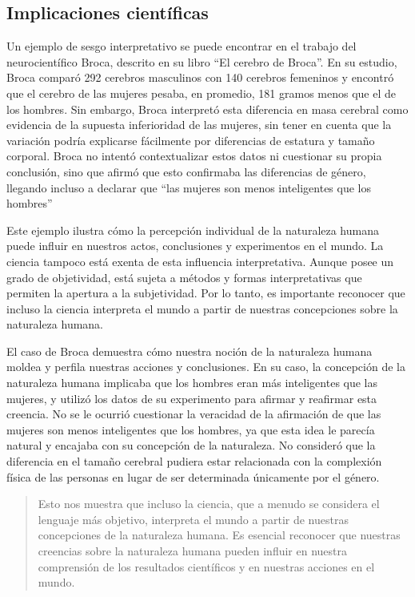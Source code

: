 \documentclass[
  a4paper,
]{article}
\begin{document}
\subsection{Implicaciones
científicas}\label{implicaciones-cientuxedficas}

Un ejemplo de sesgo interpretativo se puede encontrar en el trabajo del
neurocientífico Broca, descrito en su libro ``El cerebro de Broca''. En
su estudio, Broca comparó 292 cerebros masculinos con 140 cerebros
femeninos y encontró que el cerebro de las mujeres pesaba, en promedio,
181 gramos menos que el de los hombres. Sin embargo, Broca interpretó
esta diferencia en masa cerebral como evidencia de la supuesta
inferioridad de las mujeres, sin tener en cuenta que la variación podría
explicarse fácilmente por diferencias de estatura y tamaño corporal.
Broca no intentó contextualizar estos datos ni cuestionar su propia
conclusión, sino que afirmó que esto confirmaba las diferencias de
género, llegando incluso a declarar que ``las mujeres son menos
inteligentes que los hombres''

Este ejemplo ilustra cómo la percepción individual de la naturaleza
humana puede influir en nuestros actos, conclusiones y experimentos en
el mundo. La ciencia tampoco está exenta de esta influencia
interpretativa. Aunque posee un grado de objetividad, está sujeta a
métodos y formas interpretativas que permiten la apertura a la
subjetividad. Por lo tanto, es importante reconocer que incluso la
ciencia interpreta el mundo a partir de nuestras concepciones sobre la
naturaleza humana.

El caso de Broca demuestra cómo nuestra noción de la naturaleza humana
moldea y perfila nuestras acciones y conclusiones. En su caso, la
concepción de la naturaleza humana implicaba que los hombres eran más
inteligentes que las mujeres, y utilizó los datos de su experimento para
afirmar y reafirmar esta creencia. No se le ocurrió cuestionar la
veracidad de la afirmación de que las mujeres son menos inteligentes que
los hombres, ya que esta idea le parecía natural y encajaba con su
concepción de la naturaleza. No consideró que la diferencia en el tamaño
cerebral pudiera estar relacionada con la complexión física de las
personas en lugar de ser determinada únicamente por el género.

\begin{quote}
Esto nos muestra que incluso la ciencia, que a menudo se considera el
lenguaje más objetivo, interpreta el mundo a partir de nuestras
concepciones de la naturaleza humana. Es esencial reconocer que nuestras
creencias sobre la naturaleza humana pueden influir en nuestra
comprensión de los resultados científicos y en nuestras acciones en el
mundo.
\end{quote}
\end{document}
